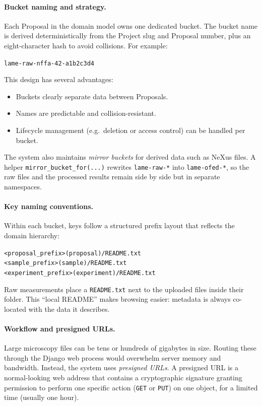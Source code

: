 \paragraph{Bucket naming and strategy.}
Each Proposal in the domain model owns one dedicated bucket.  
The bucket name is derived deterministically from the Project slug and Proposal number, 
plus an eight-character hash to avoid collisions.  
For example:
\begin{center}
	\texttt{lame-raw-nffa-42-a1b2c3d4}
\end{center}

This design has several advantages:
\begin{itemize}
	\item Buckets clearly separate data between Proposals.  
	\item Names are predictable and collision-resistant.  
	\item Lifecycle management (e.g.\ deletion or access control) can be handled per bucket.  
\end{itemize}

The system also maintains \emph{mirror buckets} for derived data such as NeXus files.  
A helper \texttt{mirror\_bucket\_for(...)} rewrites \texttt{lame-raw-*} into \texttt{lame-ofed-*}, 
so the raw files and the processed results remain side by side but in separate namespaces.

\paragraph{Key naming conventions.}
Within each bucket, keys follow a structured prefix layout that reflects the domain hierarchy:
\begin{center}
	\texttt{<proposal\_prefix>(proposal)/README.txt} \\
	\texttt{<sample\_prefix>(sample)/README.txt} \\
	\texttt{<experiment\_prefix>(experiment)/README.txt}
\end{center}

Raw measurements place a \texttt{README.txt} next to the uploaded files inside their folder.  
This ``local README'' makes browsing easier: metadata is always co-located with the data it describes.

\paragraph{Workflow and presigned URLs.}
Large microscopy files can be tens or hundreds of gigabytes in size.  
Routing these through the Django web process would overwhelm server memory and bandwidth.  
Instead, the system uses \emph{presigned URLs}.  
A presigned URL is a normal-looking web address that contains a cryptographic signature 
granting permission to perform one specific action (\texttt{GET} or \texttt{PUT}) on one object, 
for a limited time (usually one hour).  

